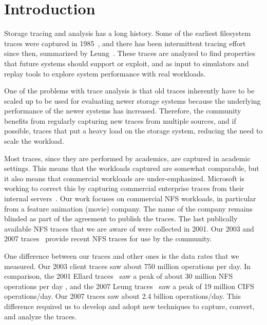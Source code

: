 \section{Introduction}

Storage tracing and analysis has a long history.  Some of the earliest
filesystem traces were captured in 1985~\cite{ousterhout85}, and there
has been intermittent tracing effort since then, summarized by
Leung~\cite{LeungUsenix08}.  These traces are
analyzed to find properties that future systems should support or
exploit, and as input to simulators and replay tools to explore system
performance with real workloads.

One of the problems
with trace analysis is that old traces inherently have to be scaled up
to be used for evaluating newer storage systems because the
underlying performance of the newer systems has increased.  Therefore,
the community benefits from regularly capturing new traces from multiple
sources, and if possible, traces that put a heavy load on the storage
system, reducing the need to scale the workload.

Most traces, since they are performed by academics, are captured in
academic settings.  This means that the workloads captured are
somewhat comparable, but it also means that commercial workloads are
under-emphasized.  Microsoft is working to correct this by capturing
commercial enterprise traces from their internal
servers~\cite{snia-iotta-microsoft}.  Our work focuses on commercial
NFS workloads, in particular from a feature animation (movie) company.
The name of the company remains blinded as part of the agreement to
publish the traces.  The last publically available NFS traces that we
are aware of were collected in 2001.  Our 2003 and 2007
traces~\cite{animation-bear-traces} provide recent NFS traces for use
by the community.

One difference between our traces and other ones is the data rates
that we measured.  Our 2003 client traces saw about 750 million
operations per day.  In comparison, the 2001 Ellard
traces~\cite{EllardFast03} saw a peak of about 30 million NFS
operations per day , and the 2007 Leung traces~\cite{LeungUsenix08}
saw a peak of 19 million CIFS operations/day.  Our 2007 traces saw
about 2.4 billion operations/day.  This difference required us to
develop and adopt new techniques to capture, convert, and analyze the
traces.

